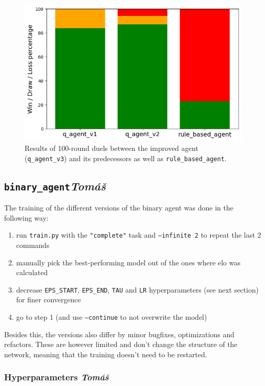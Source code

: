 \documentclass{article}
\begin{document}
\begin{figure}[h]
    \centering
    \includegraphics[width=.7\linewidth]{figures/q_agent_v3_performance.png}
    \caption{Results of 100-round duels between the improved agent (\texttt{q\_agent\_v3}) and its predecessors as well as \texttt{rule\_based\_agent}.}
    \label{fig:q_agent_v3_performance}
\end{figure}

\clearpage

\subsection[\texttt{binary\_agent}]{\texttt{binary\_agent}{\normalsize \normalfont \it \hfill Tomáš}}

The training of the different versions of the binary agent was done in the following way:
\begin{enumerate}
    \item run \texttt{train.py} with the \texttt{"complete"} task and \texttt{--infinite 2} to repeat the last 2 commands
    \item manually pick the best-performing model out of the ones where elo was calculated
    \item decrease \texttt{EPS\_START}, \texttt{EPS\_END}, \texttt{TAU} and \texttt{LR} hyperparameters (see next section) for finer convergence
    \item go to step 1 (and use \texttt{--continue} to not overwrite the model)
\end{enumerate}

Besides this, the versions also differ by minor bugfixes, optimizations and refactors.
These are however limited and don't change the structure of the network, meaning that the training doesn't need to be restarted.

\subsubsection[Hyperparameters]{Hyperparameters {\normalsize \normalfont \it \hfill Tomáš}}
\end{document}

